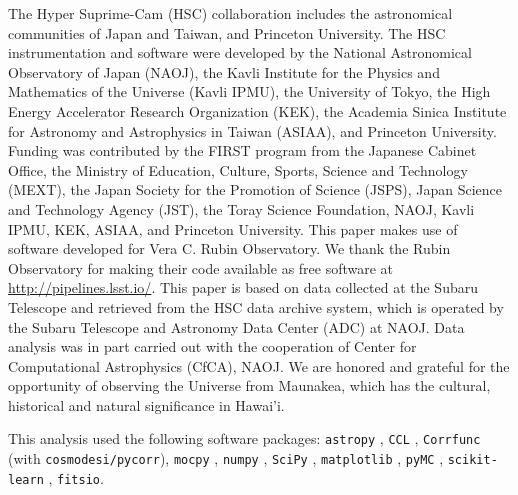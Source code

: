 The Hyper Suprime-Cam (HSC) collaboration includes the astronomical communities of Japan and Taiwan, and Princeton University. The HSC instrumentation and software were developed by the National Astronomical Observatory of Japan (NAOJ), the Kavli Institute for the Physics and Mathematics of the Universe (Kavli IPMU), the University of Tokyo, the High Energy Accelerator Research Organization (KEK), the Academia Sinica Institute for Astronomy and Astrophysics in Taiwan (ASIAA), and Princeton University. Funding was contributed by the FIRST program from the Japanese Cabinet Office, the Ministry of Education, Culture, Sports, Science and Technology (MEXT), the Japan Society for the Promotion of Science (JSPS), Japan Science and Technology Agency (JST), the Toray Science Foundation, NAOJ, Kavli IPMU, KEK, ASIAA, and Princeton University. This paper makes use of software developed for Vera C. Rubin Observatory. We thank the Rubin Observatory for making their code available as free software at \url{http://pipelines.lsst.io/}. This paper is based on data collected at the Subaru Telescope and retrieved from the HSC data archive system, which is operated by the Subaru Telescope and Astronomy Data Center (ADC) at NAOJ. Data analysis was in part carried out with the cooperation of Center for Computational Astrophysics (CfCA), NAOJ. We are honored and grateful for the opportunity of observing the Universe from Maunakea, which has the cultural, historical and natural significance in Hawai'i. 

This analysis used the following software packages: \texttt{astropy} \cite{astropy2013paper1, astropy2018paper2, astropy2023paper3},  \texttt{CCL} \cite{CCLChisari2019}, \texttt{Corrfunc}  \cite{Sinha2019corrfunc1, Sinha2019corrfunc2} (with \texttt{cosmodesi/pycorr}), \texttt{mocpy} \cite{fernique2015moc},  \texttt{numpy} \cite{harris2020numpy}, \texttt{SciPy} \cite{2020SciPyNMeth}, \texttt{matplotlib} \cite{Hunter2007Matplotlib}, \texttt{pyMC} \cite{Abril-Pla_PyMC_a_modern_2023}, \texttt{scikit-learn}  \cite{ScikitLearnPedregosa2011}, \texttt{fitsio}.